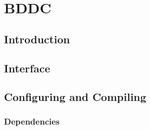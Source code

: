 \chapter{BDDC}
\label{C:BDDC}


\section{Introduction}\label{S:BDDC:Introduction}

\section{Interface}\label{S:BDDC:Interface}

\section{Configuring and Compiling}\label{S::BDDC:Config}

\subsection{Dependencies}


